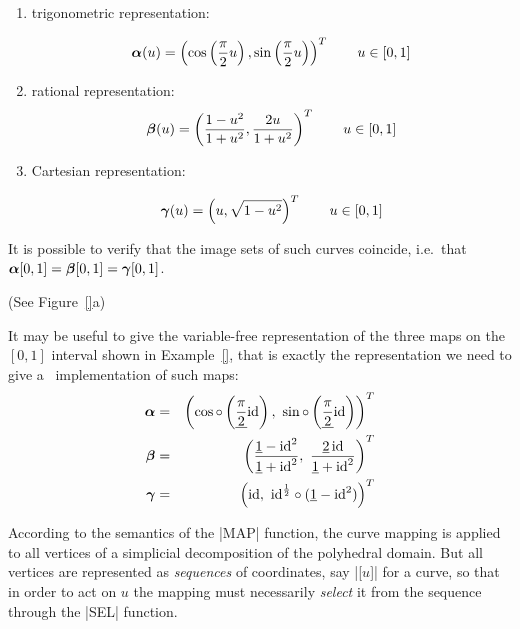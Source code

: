\begin{coding}[Algebraic computation of FE = $\delta_1$]
{\begin{condition}
\begin{enumerate}
\item  trigonometric representation:

\[
{\mbox{\boldmath $\alpha$}}(u) = \left(\cos \left({\pi \over 2}u\right), \sin \left({\pi \over
2}u\right)\right)^T \qquad u\in[0,1]
\]

\item  rational representation:
\[
{\mbox{\boldmath $\beta$}}(u) = \left({1-u^2 \over 1+u^2}, {2u \over 1+u^2}\right)^T
\qquad u\in[0,1]
\]


\item  Cartesian representation:

\[
{\mbox{\boldmath $\gamma$}}(u) = \left(u, \sqrt{1-u^2}\right)^T
\qquad u\in[0,1]
\]

\end{enumerate}

It is possible to verify that the image sets of such curves coincide, 
i.e.~that ${\mbox{\boldmath $\alpha$}}[0,1]={\mbox{\boldmath $\beta$}}[0,1]={\mbox{\boldmath $\gamma$}}[0,1]$.

\end{condition}


\begin{condition} (See Figure~\ref{}a)
\label{ex:5:4:freearc}
  
It may be useful to give the variable-free representation of the three
maps on the $[0,1]$ interval shown in Example~\ref{},
that is exactly the representation we need to give a \pl\
implementation of such maps:
\begin{eqnarray}
{\mbox{\boldmath $\alpha$}} &=& \left(\cos \circ \left( \underline{\pi \over 2} 
\textrm{id}\right), \
\sin \circ \left( \underline{\pi \over 2} \textrm{id} \right) \right)^T
\\
{\mbox{\boldmath $\beta$}} &=& \left(\frac{\underline{1} - 
\textrm{id}^2 }{ \underline{1}+ \textrm{id}^2}, \
{\underline{2} \,\textrm{id} \over \underline{1}+ \textrm{id}^2} 
\right)^T
\\
{\mbox{\boldmath $\gamma$}} &=& \left( \textrm{id}, \ \textrm{id}^{1\over 2}\circ 
(\underline{1}- \textrm{id}^2) \right)^T
\label{eq:5:alpha}
\end{eqnarray}

According to the semantics of the |MAP| function, the curve
mapping is applied to all vertices of a simplicial decomposition of
the polyhedral domain.  But all vertices are represented as
\emph{sequences} of coordinates, say |[$u$]| for a curve, so
that in order to act on $u$ the mapping must necessarily \emph{select}
it from the sequence through the |SEL| function.


\end{condition}}
\end{coding}
